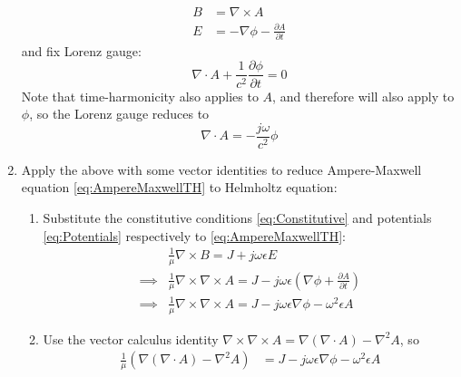 \documentclass{article}
\begin{document}
\begin{enumerate}
\begin{subequations}
                \begin{align}
                    B &= \nabla \times A \label{eq:MagneticPotential} \\
                    E &= - \nabla \phi - \frac{\partial A}{\partial t} \label{eq:ElectricPotential}
                \end{align}
            \end{subequations}
            and fix Lorenz gauge:
            \begin{equation*} \label{eq:LorenzGaugeConditionUnreduced}
                \nabla \cdot A + \frac{1}{c^2} \frac{\partial \phi}{\partial t} = 0
            \end{equation*}
            Note that time-harmonicity also applies to $A$, and therefore will also apply to $\phi$, so the Lorenz gauge reduces to
            \begin{equation} \label{eq:LorenzGaugeCondition}
                \nabla \cdot A = - \frac{j \omega}{c^2} \phi
            \end{equation}
    \item   Apply the above with some vector identities to reduce Ampere-Maxwell equation \eqref{eq:AmpereMaxwellTH} to Helmholtz equation:
            \begin{enumerate}
                \item Substitute the constitutive conditions \eqref{eq:Constitutive} and potentials \eqref{eq:Potentials} respectively to \eqref{eq:AmpereMaxwellTH}:
                    \begin{align*}
                        & \frac{1}{\mu} \nabla \times B = J + j \omega \epsilon E \\
                        \implies & \frac{1}{\mu} \nabla \times \nabla \times A = J - j \omega \epsilon \left( \nabla \phi + \frac{\partial A}{\partial t} \right) \\
                        \implies & \frac{1}{\mu} \nabla \times \nabla \times A = J - j \omega \epsilon \nabla \phi - \omega^2 \epsilon A
                    \end{align*}
                \item Use the vector calculus identity $\nabla \times \nabla \times A = \nabla(\nabla \cdot A) - \nabla^2 A$, so
                    \begin{align*}
                        \frac{1}{\mu} \left( \nabla(\nabla \cdot A) - \nabla^2 A \right) &= J - j \omega \epsilon \nabla \phi - \omega^2 \epsilon A
                    \end{align*}

\end{enumerate}
\end{enumerate}
\end{document}
